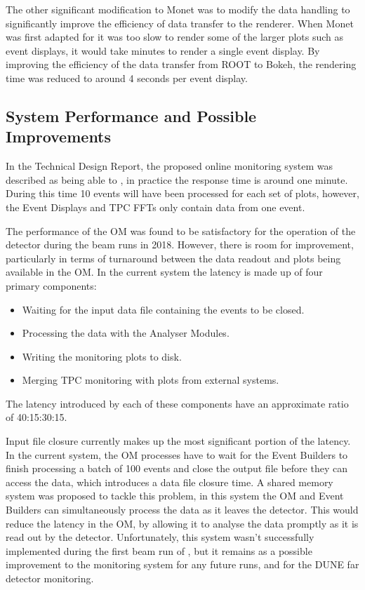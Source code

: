 The other significant modification to Monet was to modify the data handling to 
significantly improve the efficiency of data transfer to the renderer.
When Monet was first adapted for \protodune{} it was too slow to render some 
of the larger plots such as event displays, it would take minutes to render a 
single event display. By improving the efficiency of the data transfer from ROOT
to Bokeh, the rendering time was reduced to around 4 seconds per event display.

\subsection{System Performance and Possible Improvements}
In the \protodune{} Technical Design Report\cite{Abi:2017aow}, the proposed 
online monitoring system was described as being able to , in practice the response time is around one 
minute.  During this time 10 events will have been processed for each set of 
plots, however, the Event Displays and TPC FFTs only contain data from one 
event.

The performance of the OM was found to be satisfactory for the operation of the
\protodune{} detector during the beam runs in 2018. However, there is room for
improvement, particularly in terms of turnaround between the data readout and
plots being available in the OM. In the current system the latency is made up 
of four primary components:
\begin{itemize}
	\item Waiting for the input data file containing the events to be closed.
	\item Processing the data with the Analyser Modules.
	\item Writing the monitoring plots to disk.
	\item Merging TPC monitoring with plots from external systems.
\end{itemize}
The latency introduced by each of these components have an approximate ratio of 
40:15:30:15. 

Input file closure currently makes up the most significant portion 
of the latency. In the current system, the OM processes have to wait for the 
Event Builders to finish processing a batch of 100 events and close the output 
file before they can access the data, which introduces a data file closure 
time. A shared memory system was proposed to tackle this problem, in this 
system the OM and Event Builders can simultaneously process the data as it 
leaves the detector.  This would reduce the latency in the OM, by allowing it 
to analyse the data promptly as it is read out by the detector. Unfortunately, 
this system wasn't successfully implemented during the first beam run of 
\protodune{}, but it remains as a possible improvement to the monitoring 
system for any future \protodune{} runs, and for the DUNE far detector 
monitoring.

